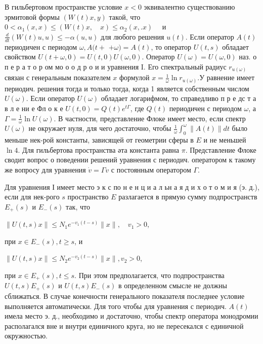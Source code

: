 \documentclass[10pt]{article}
\begin{document}
В гильбертовом пространстве условие $x<0$ эквивалентно существованию эрмитовой формы $(W(t) x, y)$ такой, что $0<\alpha_{1}(x, x) \leqslant(W(t) x, \quad x) \leqslant \alpha_{2}(x, . x) \quad$ и $\frac{d}{d t}(W(t) u, u) \leqslant-\alpha(u, u)$ для любого решения $u(t)$. Если оператор $A(t)$ периодичен с периодом $\omega, A(t+$ $+\omega)=A(t)$, то оператор $U(t, s)$ обладает свойством $U(t+\omega, 0)=U(t, 0) U(\omega, 0)$. Оператор $U(\omega)=U(\omega, 0)$ наз. о п е р а т о р ом мо о о д р о и и уравнения I. Его спектральный радиус $r_{u(\omega)}$ связан с генеральным показателем $x$ формулой $x=\frac{1}{\omega} \ln r_{u(\omega)}$.У равнение имеет периодич. решения тогда и только тогда, когда 1 является собственным числом $U(\omega)$. Если оператор $U(\omega)$ обладает логарифмом, то справедливо п р е дс т а в л е ни е Фл о к е $U(t, 0)=Q(t) e^{t \Gamma}$, где $Q(t)$ периодичен с периодом $\omega$, а $\Gamma=\frac{1}{\omega} \ln U(\omega)$. В частности, представление Флоке имеет место, если спектр $U(\omega)$ не окружает нуля, для чего достаточно, чтобы $\frac{1}{\omega} \int_{0}^{\omega}\|A(t)\| d t$ было меньше нек-рой константы, зависящей от геометрии сферы в $E$ и не меньшей $\ln 4$. Для гильбертова пространства әта константа равна $\pi$. Представление Флоке сводит вопрос о поведении решений уравнения с периодич. оператором к такому же вопросу для уравнения $\dot{v}=\Gamma v$ с постоянным оператором $\Gamma$.



Для уравнения І имеет место э к с по н е н ц и а л ьн а я д и х о т о м и я (э. д.), если для нек-рого $s$ пространство $E$ разлагается в прямую сумму подпространств $E_{+}(s)$ и $E_{-}(s)$ так, что



$\|U(t, s) x\| \leqslant N_{1} e^{-v_{1}(t-s)}\|x\|, \quad v_{1}>0$,



при $x \in E_{-}(s), t \geqslant s$, и



$\|U(t, s) x\| \leqslant N_{2} e^{-v_{2}(t-s)}\|x\|, v_{2}>0$,



при $x \in E_{+}(s), t \leqslant s$. При этом предполагается, что подпространства $U(t, s) E_{+}(s)$ и $U(t, s) E_{-}(s)$ в определенном смысле не должны сближаться. В случае конечности генерального показателя последнее условие выполняется автоматически. Для того чтобы для уравнения с периодич. $A(t)$ имела место э. д., необходимо и достаточно, чтобы спектр оператора монодромии располагался вне и внутри единичного круга, но не пересекался с единичной окружностью.
\end{document}
